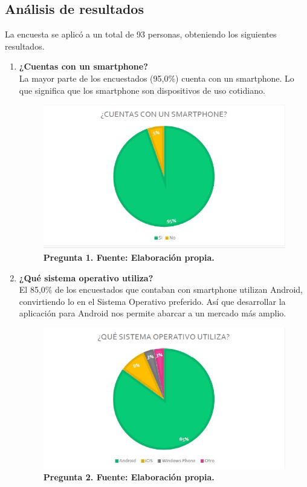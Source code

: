 \subsection{Análisis de resultados}
La encuesta se aplicó a un total de 93 personas, obteniendo los siguientes resultados.
    \begin{enumerate}
        \item \textbf{¿Cuentas con un smartphone?}\\
        La mayor parte de los encuestados (95,0\%) cuenta con un smartphone. Lo que significa que los smartphone son dispositivos de uso cotidiano.\\
        \begin{figure}[h!]
	        \centering	            
	        \includegraphics[width=15.5cm]{IMG/Graficas/1}
	            \caption{ \textbf{Pregunta 1. Fuente: Elaboración propia.}}
	            \label{fig:edomercado1}
	\end{figure}
	\newpage
	
        \item \textbf{¿Qué sistema operativo utiliza?}\\
        El 85,0\% de los encuestados que contaban con smartphone utilizan Android, convirtiendo lo en el Sistema Operativo preferido. Así que desarrollar la aplicación para Android nos permite abarcar a un mercado más amplio.
        \begin{figure}[h!]
	        \centering	            
	        \includegraphics[width=15.5cm]{IMG/Graficas/2}
	            \caption{ \textbf{Pregunta 2. Fuente: Elaboración propia.}}
	            \label{fig:edomercado2}
	\end{figure}
	\newpage
	

\end{enumerate}
